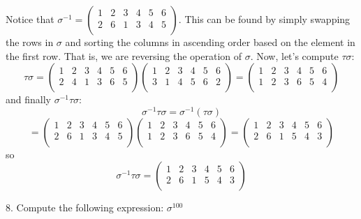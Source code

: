 \documentclass{article}
\begin{document}
Notice that $\sigma^{-1} = \begin{pmatrix} 1 & 2 & 3 & 4 & 5 & 6\\ 2 & 6 & 1 & 3 & 4 & 5\\  \end{pmatrix}$. This can be found by simply swapping the rows in $\sigma$ and sorting the columns in ascending order based on the element in the first row. That is, we are reversing the operation of $\sigma$. Now, let's compute $\tau \sigma$:
\[\tau \sigma = \begin{pmatrix}
    1 & 2 & 3 & 4 & 5 & 6\\
    2 & 4 & 1 & 3 & 6 & 5\\
\end{pmatrix}
\begin{pmatrix}
    1 & 2 & 3 & 4 & 5 & 6\\
    3 & 1 & 4 & 5 & 6 & 2\\
\end{pmatrix}
 = 
 \begin{pmatrix}
    1 & 2 & 3 & 4 & 5 & 6\\
    1 & 2 & 3 & 6 & 5 & 4\\
 \end{pmatrix}\]
and finally $\sigma^{-1} \tau \sigma$:
\[\sigma^{-1} \tau \sigma = \sigma^{-1} (\tau \sigma)\]
\[ = \begin{pmatrix}
   1 & 2 & 3 & 4 & 5 & 6\\
   2 & 6 & 1 & 3 & 4 & 5\\
\end{pmatrix}
\begin{pmatrix}
    1 & 2 & 3 & 4 & 5 & 6\\
    1 & 2 & 3 & 6 & 5 & 4\\
\end{pmatrix}
= 
\begin{pmatrix}
    1 & 2 & 3 & 4 & 5 & 6\\
    2 & 6 & 1 & 5 & 4 & 3\\
\end{pmatrix}\]
so 
\[\sigma^{-1} \tau \sigma = \begin{pmatrix}
    1 & 2 & 3 & 4 & 5 & 6\\
    2 & 6 & 1 & 5 & 4 & 3\\
\end{pmatrix}\]

8. Compute the following expression: $\sigma^{100}$
\newline
\end{document}
